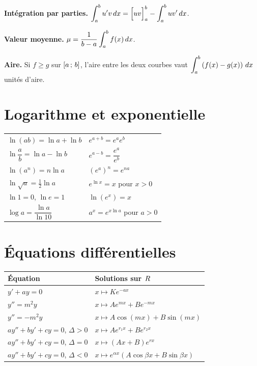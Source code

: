 \noindent
\textbf{Intégration par parties.}
$\displaystyle\int_{a}^{b}u'v\,dx = \Bigl[uv\Bigr]_{a}^{b}
-\int_{a}^{b}uv'\,dx$.

\smallskip
\noindent
\textbf{Valeur moyenne.} $\mu = \dfrac{1}{b-a}\displaystyle\int_{a}^{b}f(x)\,dx$.

\smallskip
\noindent
\textbf{Aire.} Si $f \geq g$ sur $\left[a\,;\,b\right]$, l'aire entre les deux
courbes vaut $\displaystyle\int_{a}^{b}\left(f(x)-g(x)\right)\,dx$ unités
d'aire.

\section*{Logarithme et exponentielle}

\begin{center}
\setlength{\tabcolsep}{10pt}
\renewcommand{\arraystretch}{1.5}
\begin{tabular}{@{}ll@{}}
\toprule
$\ln(ab) = \ln a+\ln b$ & $e^{a+b} = e^{a}e^{b}$ \\
$\ln\dfrac ab = \ln a-\ln b$ & $e^{a-b} = \dfrac{e^{a}}{e^{b}}$ \\
$\ln\!\left(a^{n}\right) = n\ln a$ & $\left(e^{a}\right)^{n} = e^{na}$ \\
$\ln\sqrt a = \frac12\ln a$ & $e^{\ln x} = x$ pour $x>0$ \\
$\ln 1 = 0$, $\ln e = 1$ & $\ln\!\left(e^{x}\right) = x$ \\
$\log a = \dfrac{\ln a}{\ln 10}$ & $a^{x} = e^{x\ln a}$ pour $a>0$ \\
\bottomrule
\end{tabular}
\end{center}

\section*{Équations différentielles}

\begin{center}
\setlength{\tabcolsep}{10pt}
\renewcommand{\arraystretch}{1.5}
\begin{tabular}{@{}ll@{}}
\toprule
Équation & Solutions sur $R$ \\
\midrule
$y'+ay = 0$ & $x \mapsto Ke^{-ax}$ \\
$y'' = m^{2}y$ & $x \mapsto Ae^{mx}+Be^{-mx}$ \\
$y'' = -m^{2}y$ & $x \mapsto A\cos(mx)+B\sin(mx)$ \\
$ay''+by'+cy = 0$, $\Delta>0$ &
  $x \mapsto Ae^{r_{1}x}+Be^{r_{2}x}$ \\
$ay''+by'+cy = 0$, $\Delta = 0$ &
  $x \mapsto (Ax+B)e^{rx}$ \\
$ay''+by'+cy = 0$, $\Delta<0$ &
  $x \mapsto e^{\alpha x}\left(A\cos\beta x+B\sin\beta x\right)$ \\
\bottomrule
\end{tabular}
\end{center}

